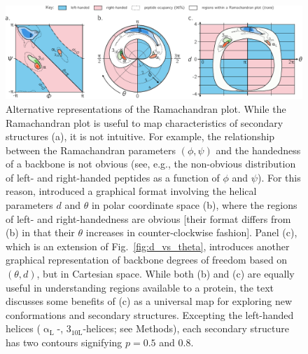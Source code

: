 \documentclass[fleqn,10pt,lineno]{wlpeerj} %
\newcommand{\n}[1]{{\color{black}#1}} %
\newcommand{\Fig}[1]{Fig.~\ref{#1}}
\begin{document}
\begin{figure}[t!]
\begin{adjustwidth}{-1in}{0in} %
\centering
\includegraphics[width=1.0\linewidth]{./figures/various_2d_distributions.pdf}
\caption{\label{fig:alternatives} 
Alternative representations of the Ramachandran plot. While the Ramachandran plot is useful to map characteristics of secondary structures (a), it is not intuitive. For example, the relationship between the Ramachandran parameters $(\phi,\psi)$ and the handedness of a backbone is not obvious (see, e.g., the non-obvious distribution of left- and right-handed peptides as a function of $\phi$ and $\psi$). For this reason, \cite{Zacharias2013} introduced a graphical format involving the helical parameters $d$ and $\theta$ in polar coordinate space (b), where the regions of left- and right-handedness are obvious [their format differs from (b) in that their $\theta$ increases in counter-clockwise fashion]. Panel (c), which is an extension of \Fig{fig:d_vs_theta}, introduces another graphical representation of backbone degrees of freedom based on $(\theta,d)$, but  in Cartesian space. While both (b) and (c) are equally useful in understanding regions available to a protein, the text discusses some benefits of (c) as a universal map for exploring new conformations and secondary structures. Excepting the left-handed helices ($\upalpha_\textrm{L}$-, $3_\textrm{10L}$-helices\n{; see Methods}), each secondary structure has two contours signifying $p=0.5$ and $0.8$.
}
\end{adjustwidth}
\end{figure}
\end{document}
